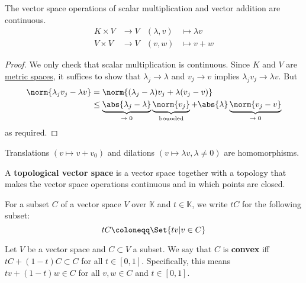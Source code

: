 \documentclass{article}
\newcommand{\K}{\mathbb{K}}
\begin{document}
\begin{fact}
    The vector space operations of scalar multiplication and vector addition are continuous.
    \begin{align*}
        K \times V &\to V & (\lambda, v) &\mapsto \lambda v \\
        V \times V &\to V & (v, w) &\mapsto v + w
    \end{align*}
\end{fact}

\begin{proof}
    We only check that scalar multiplication is continuous. Since $K$ and $V$ are \hyperlink{def:metric-on-vector-space}{metric spaces}, it suffices to show that $\lambda_j \to \lambda$ and $v_j \to v$ implies $\lambda_j v_j \to \lambda v$. But
    \begin{align*}
        \norm{\lambda_j v_j - \lambda v} &= \norm{(\lambda_j - \lambda) v_j + \lambda(v_j - v)} \\
                                         &\leq \underbrace{\abs{\lambda_j - \lambda}}_\text{$\to 0$} \underbrace{\norm{v_j}}_\text{bounded} + \abs{\lambda} \underbrace{\norm{v_j - v}}_\text{$\to 0$}
    \end{align*}
    as required.
\end{proof}

\begin{cor}
    Translations $(v \mapsto v + v_0)$ and dilations $(v \mapsto \lambda v, \lambda \ne 0)$ are homomorphisms.
\end{cor}

\begin{defi}
    A \textbf{topological vector space} is a vector space together with a topology that makes the vector space operations continuous and in which points are closed.
\end{defi}

\begin{notation}
    For a subset $C$ of a vector space $V$ over $\K$ and $t \in \K$, we write $t C$ for the following subset:
    \begin{equation*}
        t C \coloneqq \Set{t v | v \in C}
    \end{equation*}
\end{notation}

\begin{defi}
    Let $V$ be a vector space and $C \subset V$ a subset.  We say that $C$ is \textbf{convex} iff $t C + (1-t) C \subset C$ for all $t \in [0, 1]$. Specifically, this means $t v + (1-t) w \in C$ for all $v, w \in C$ and $t \in [0, 1]$.
\end{defi}
\end{document}
